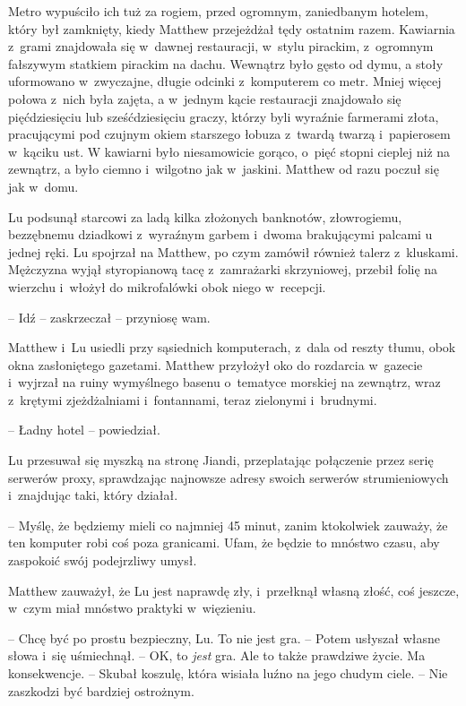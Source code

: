 \documentclass[oneside,polish,11pt,rmheadings]{mwbk}
\begin{document}
Metro wypuściło ich tuż za rogiem, przed ogromnym, zaniedbanym hotelem, który był zamknięty, kiedy Matthew przejeżdżał tędy ostatnim razem. Kawiarnia z~grami znajdowała się w~dawnej restauracji, w~stylu pirackim, z~ogromnym fałszywym statkiem pirackim na dachu. Wewnątrz było gęsto od dymu, a stoły uformowano w~zwyczajne, długie odcinki z~komputerem co metr. Mniej więcej połowa z~nich była zajęta, a w~jednym kącie restauracji znajdowało się pięćdziesięciu lub sześćdziesięciu graczy, którzy byli wyraźnie farmerami złota, pracującymi pod czujnym okiem starszego łobuza z~twardą twarzą i~papierosem w~kąciku ust. W kawiarni było niesamowicie gorąco, o~pięć stopni cieplej niż na zewnątrz, a było ciemno i~wilgotno jak w~jaskini. Matthew od razu poczuł się jak w~domu.

Lu podsunął starcowi za ladą kilka złożonych banknotów, złowrogiemu, bezzębnemu dziadkowi z~wyraźnym garbem i~dwoma brakującymi palcami u jednej ręki. Lu spojrzał na Matthew, po czym zamówił również talerz z~kluskami. Mężczyzna wyjął styropianową tacę z~zamrażarki skrzyniowej, przebił folię na wierzchu i~włożył do mikrofalówki obok niego w~recepcji. 

-- Idź -- zaskrzeczał -- przyniosę wam.

Matthew i~Lu usiedli przy sąsiednich komputerach, z~dala od reszty tłumu, obok okna zasłoniętego gazetami. Matthew przyłożył oko do rozdarcia w~gazecie i~wyjrzał na ruiny wymyślnego basenu o~tematyce morskiej na zewnątrz, wraz z~krętymi zjeżdżalniami i~fontannami, teraz zielonymi i~brudnymi. 

-- Ładny hotel -- powiedział.

Lu przesuwał się myszką na stronę Jiandi, przeplatając połączenie przez serię serwerów proxy, sprawdzając najnowsze adresy swoich serwerów strumieniowych i~znajdując taki, który działał. 

-- Myślę, że będziemy mieli co najmniej 45 minut, zanim ktokolwiek zauważy, że ten komputer robi coś poza granicami. Ufam, że będzie to mnóstwo czasu, aby zaspokoić swój podejrzliwy umysł.

Matthew zauważył, że Lu jest naprawdę zły, i~przełknął własną złość, coś jeszcze, w~czym miał mnóstwo praktyki w~więzieniu. 

-- Chcę być po prostu bezpieczny, Lu. To nie jest gra. -- Potem usłyszał własne słowa i~się uśmiechnął. -- OK, to \textit{jest }gra. Ale to także prawdziwe życie. Ma konsekwencje. -- Skubał koszulę, która wisiała luźno na jego chudym ciele. -- Nie zaszkodzi być bardziej ostrożnym.
\end{document}
